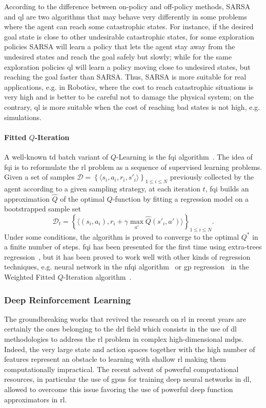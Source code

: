 According to the difference between on-policy and off-policy methods, SARSA and \gls{ql} are two algorithms that may behave very differently in some problems where the agent can reach some catastrophic states. For instance, if the desired goal state is close to other undesirable catastrophic states, for some exploration policies SARSA will learn a policy that lets the agent stay away from the undesired states and reach the goal safely but slowly; while for the same exploration policies \gls{ql} will learn a policy moving close to undesired states, but reaching the goal faster than SARSA. Thus, SARSA is more suitable for real applications, e.g. in Robotics, where the cost to reach catastrophic situations is very high and is better to be careful not to damage the physical system; on the contrary, \gls{ql} is more suitable when the cost of reaching bad states is not high, e.g. simulations.

\paragraph{Fitted $Q$-Iteration}\label{S:FQI}
A well-known \gls{td} batch variant of $Q$-Learning is the \gls{fqi} algorithm~\cite{ernst2005tree}. The idea of \gls{fqi} is to reformulate the \gls{rl} problem as a sequence of supervised learning problems. Given a set of samples $\mathcal{D} = \left\{\langle s_i, a_i, r_i, s'_i \rangle \right\}_{1\leq i\leq N}$ previously collected by the agent according to a given sampling strategy, at each iteration $t$, \gls{fqi} builds an approximation $\hat{Q}$ of the optimal $Q$-function by fitting a regression model on a bootstrapped sample set
\begin{equation}
 \mathcal{D}_t = \left\{ \langle (s_i,a_i), r_i + \gamma \max_{a'} \hat{Q}\left(s'_i, a'\right) \rangle\right\}_{1 \leq i \leq N}.
\end{equation}
Under some conditions, the algorithm is proved to converge to the optimal $Q^*$ in a finite number of steps. \gls{fqi} has been presented for the first time using extra-trees regression~\cite{geurts2006extremely}, but it has been proved to work well with other kinds of regression techniques, e.g. neural network in the \gls{nfqi} algorithm~\cite{riedmiller2005neural} or \gls{gp} regression~\cite{rasmussen2005gaussian} in the Weighted Fitted $Q$-Iteration algorithm~\cite{deramo2017maximum}.

\subsubsection{Deep Reinforcement Learning}
The groundbreaking works that revived the research on \gls{rl} in recent years are certainly the ones belonging to the \gls{drl} field which consists in the use of \gls{dl} methodologies to address the \gls{rl} problem in complex high-dimensional \glspl{mdp}. Indeed, the very large state and action spaces together with the high number of features represent an obstacle to learning with shallow \gls{rl} making them computationally impractical. The recent advent of powerful computational resources, in particular the use of \glspl{gpu} for training deep neural networks in \gls{dl}, allowed to overcome this issue favoring the use of powerful deep function approximators in \gls{rl}.

